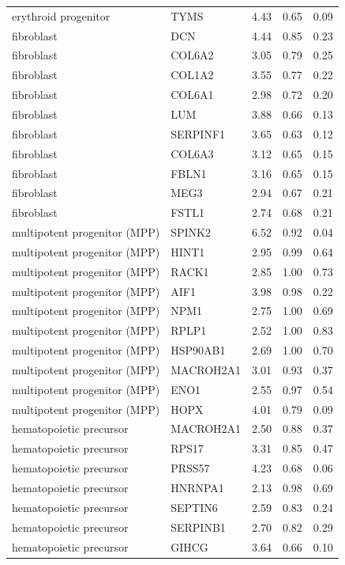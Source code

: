 \begin{longtable}{llccc}
erythroid progenitor & TYMS & 4.43 & 0.65 & 0.09 \\
fibroblast & DCN & 4.44 & 0.85 & 0.23 \\
fibroblast & COL6A2 & 3.05 & 0.79 & 0.25 \\
fibroblast & COL1A2 & 3.55 & 0.77 & 0.22 \\
fibroblast & COL6A1 & 2.98 & 0.72 & 0.20 \\
fibroblast & LUM & 3.88 & 0.66 & 0.13 \\
fibroblast & SERPINF1 & 3.65 & 0.63 & 0.12 \\
fibroblast & COL6A3 & 3.12 & 0.65 & 0.15 \\
fibroblast & FBLN1 & 3.16 & 0.65 & 0.15 \\
fibroblast & MEG3 & 2.94 & 0.67 & 0.21 \\
fibroblast & FSTL1 & 2.74 & 0.68 & 0.21 \\
multipotent progenitor (MPP) & SPINK2 & 6.52 & 0.92 & 0.04 \\
multipotent progenitor (MPP) & HINT1 & 2.95 & 0.99 & 0.64 \\
multipotent progenitor (MPP) & RACK1 & 2.85 & 1.00 & 0.73 \\
multipotent progenitor (MPP) & AIF1 & 3.98 & 0.98 & 0.22 \\
multipotent progenitor (MPP) & NPM1 & 2.75 & 1.00 & 0.69 \\
multipotent progenitor (MPP) & RPLP1 & 2.52 & 1.00 & 0.83 \\
multipotent progenitor (MPP) & HSP90AB1 & 2.69 & 1.00 & 0.70 \\
multipotent progenitor (MPP) & MACROH2A1 & 3.01 & 0.93 & 0.37 \\
multipotent progenitor (MPP) & ENO1 & 2.55 & 0.97 & 0.54 \\
multipotent progenitor (MPP) & HOPX & 4.01 & 0.79 & 0.09 \\
hematopoietic precursor & MACROH2A1 & 2.50 & 0.88 & 0.37 \\
hematopoietic precursor & RPS17 & 3.31 & 0.85 & 0.47 \\
hematopoietic precursor & PRSS57 & 4.23 & 0.68 & 0.06 \\
hematopoietic precursor & HNRNPA1 & 2.13 & 0.98 & 0.69 \\
hematopoietic precursor & SEPTIN6 & 2.59 & 0.83 & 0.24 \\
hematopoietic precursor & SERPINB1 & 2.70 & 0.82 & 0.29 \\
hematopoietic precursor & GIHCG & 3.64 & 0.66 & 0.10 \\

\end{longtable}
